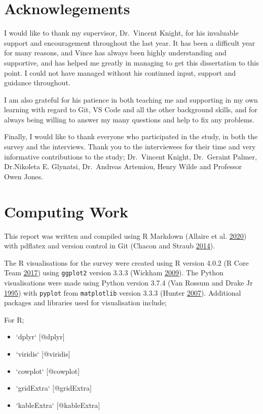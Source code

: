\documentclass[
  11pt,
]{book}
\begin{document}
\newpage

\section*{Acknowlegements}

I would like to thank my supervisor, Dr.~Vincent Knight, for his
invaluable support and encouragement throughout the last year. It has
been a difficult year for many reasons, and Vince has always been highly
understanding and supportive, and has helped me greatly in managing to
get this dissertation to this point. I could not have managed without
his continued input, support and guidance throughout.

I am also grateful for his patience in both teaching me and supporting
in my own learning with regard to Git, VS Code and all the other
background skills, and for always being willing to answer my many
questions and help to fix any problems.

Finally, I would like to thank everyone who participated in the study,
in both the survey and the interviews. Thank you to the interviewees for
their time and very informative contributions to the study; Dr.~Vincent
Knight, Dr.~Geraint Palmer, Dr.Nikoleta E. Glynatsi, Dr.~Andreas
Artemiou, Henry Wilde and Professor Owen Jones.

\section*{Computing Work}

This report was written and compiled using R Markdown (Allaire et al.
\protect\hyperlink{ref-Allaire2020-sr}{2020}) with pdflatex and version
control in Git (Chacon and Straub \protect\hyperlink{ref-git}{2014}).

The R visualisations for the survey were created using R version 4.0.2
(R Core Team \protect\hyperlink{ref-R}{2017}) using \texttt{ggplot2}
version 3.3.3 (Wickham \protect\hyperlink{ref-ggplot}{2009}). The Python
visualisations were made using Python version 3.7.4 (Van Rossum and
Drake Jr \protect\hyperlink{ref-py}{1995}) with \texttt{pyplot} from
\texttt{matplotlib} version 3.3.3 (Hunter
\protect\hyperlink{ref-matplot}{2007}). Additional packages and
libraries used for visualisation include;

For R;

\begin{itemize}
   \item `dplyr` [@dplyr]
   \item `viridis` [@viridis]
   \item `cowplot` [@cowplot]
   \item `gridExtra` [@gridExtra]
   \item `kableExtra` [@kableExtra]
\end{itemize}
\end{document}
